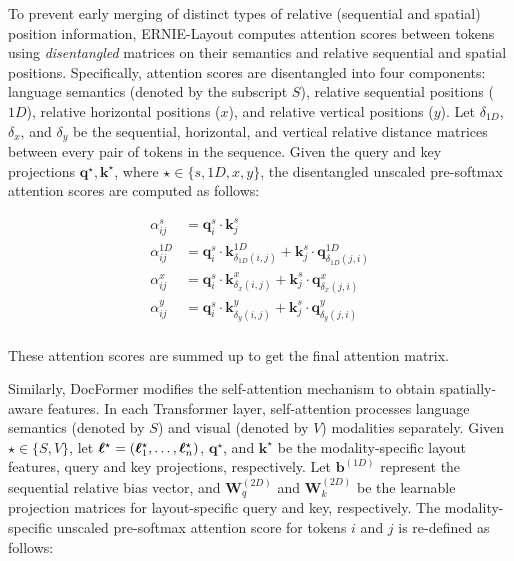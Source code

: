 To prevent early merging of distinct types of relative (sequential and spatial) position information, ERNIE-Layout \citep{peng2022ernie} computes attention scores between tokens using \textit{disentangled} matrices on their semantics and relative sequential and spatial positions. Specifically, attention scores are disentangled into four components: language semantics (denoted by the subscript $S$), relative sequential positions ($1D$), relative horizontal positions ($x$), and relative vertical positions ($y$). Let $\delta_{1D}$, $\delta_x$, and $\delta_y$ be the sequential, horizontal, and vertical relative distance matrices between every pair of tokens in the sequence. Given the query and key projections $\bm{q}^\star, \bm{k}^\star$, where $\star \in \{s, 1D, x, y\}$, the disentangled unscaled pre-softmax attention scores are computed as follows:

\begin{equation}
\begin{aligned}
    \alpha^{s}_{ij} &= \bm{q}^{s}_i \cdot \bm{k}^{s}_j \\
    \alpha^{1D}_{ij} &= \bm{q}^{s}_i \cdot \bm{k}^{1D}_{\delta_{1D}(i, j)} + \bm{k}^{s}_j  \cdot \bm{q}^{1D}_{\delta_{1D}(j, i)} \\
    \alpha^{x}_{ij} &= \bm{q}^{s}_i \cdot \bm{k}^{x}_{\delta_{x}(i, j)} + \bm{k}^{s}_j  \cdot \bm{q}^{x}_{\delta_{x}(j, i)} \\
    \alpha^{y}_{ij} &= \bm{q}^{s}_i \cdot \bm{k}^{y}_{\delta_{y}(i, j)} + \bm{k}^{s}_j  \cdot \bm{q}^{y}_{\delta_{y}(j, i)} \\
\end{aligned}
\label{eq:ernie-layout-attention}
\end{equation}

\noindent These attention scores are summed up to get the final attention matrix.

Similarly, DocFormer \citep{appalaraju2021docformer} modifies the self-attention mechanism to obtain spatially-aware features. In each Transformer layer, self-attention processes language semantics (denoted by $S$) and visual (denoted by $V$) modalities separately. Given $\star \in \{S, V\}$, let $\boldsymbol{\ell}^{\star} = (\boldsymbol{\ell}^{\star}_1, \ldots, \boldsymbol{\ell}^{\star}_n)$, $\bm{q}^\star$, and $\bm{k}^\star$ be the modality-specific layout features, query and key projections, respectively. Let $\bm{b}^{(1D)}$ represent the sequential relative bias vector, and $\bm{W}^{(2D)}_q$ and $\bm{W}^{(2D)}_k$ be the learnable projection matrices for layout-specific query and key, respectively. The modality-specific unscaled pre-softmax attention score for tokens $i$ and $j$ is re-defined as follows:


